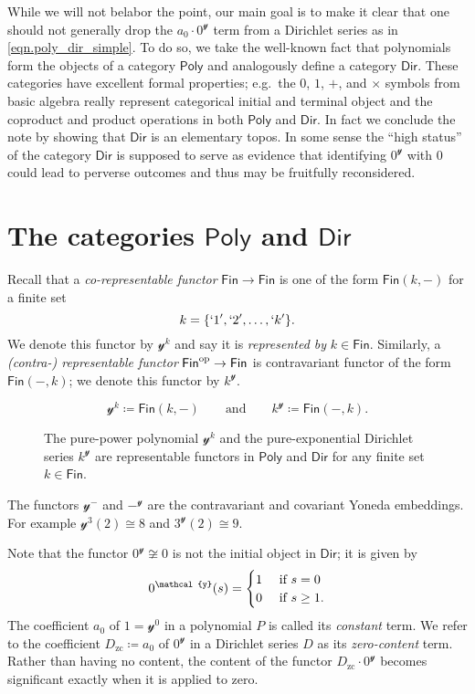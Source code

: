 \documentclass[11pt, article, one side]{memoir}
\theoremstyle{theorem}
\theoremstyle{definition}
\theoremstyle{remark}
\newcommand{\Cat}[1]{\mathsf{#1}}%
\newcommand{\op}{^\tn{op}}
\newcommand{\tn}[1]{\textnormal{#1}}
\newcommand{\finset}{\Cat{Fin}}
\newcommand{\zero}[1]{#1_\text{zc}}
\newcommand{\yon}{\mathcal{y}}
\newcommand{\poly}{\Cat{Poly}}
\newcommand{\dir}{\Cat{Dir}}
\newcommand{\mdot}{{\cdot}}
\newcommand{\qqand}{\qquad\text{and}\qquad}
\begin{document}
While we will not belabor the point, our main goal is to make it clear that one should not generally drop the $a_0\cdot0^\yon$ term from a Dirichlet series as in \cref{eqn.poly_dir_simple}. To do so, we take the well-known fact that polynomials form the objects of a category $\poly$ and analogously define a category $\dir$. These categories have excellent formal properties; e.g.\ the $0$, $1$, $+$, and $\times$ symbols from basic algebra really represent categorical initial and terminal object and the coproduct and product operations in both $\poly$ and $\dir$. In fact we conclude the note by showing that $\dir$ is an elementary topos. In some sense the ``high status'' of the category $\dir$ is supposed to serve as evidence that identifying $0^\yon$ with $0$ could lead to perverse outcomes and thus may be fruitfully reconsidered.

\chapter{The categories $\poly$ and $\dir$}
Recall that a \emph{co-representable functor} $\finset\to\finset$ is one of the form $\finset(k, -)$ for a finite set
\[k=\{`1', `2',\ldots,`k'\}.\]
We denote this functor by $\yon^k$ and say it is \emph{represented by} $k\in\finset$. Similarly, a \emph{(contra-) representable functor} $\finset\op\to\finset$ is contravariant functor of the form $\finset(-,k)$; we denote this functor by $k^\yon$.
\begin{figure}
\[
  \yon^k \coloneqq \finset(k,-)
  \qqand
  k^\yon\coloneqq\finset(-,k).
\]
  \caption{The pure-power polynomial $\yon^k$ and the pure-exponential Dirichlet series $k^\yon$ are representable functors in $\poly$ and $\dir$ for any finite set $k\in\finset$.}
\end{figure}
The functors $\yon^-$ and $-^\yon$ are the contravariant and covariant Yoneda embeddings. For example $\yon^3(2)\cong8$ and $3^\yon(2)\cong9$.

Note that the functor $0^\yon\not\cong 0$ is not the initial object in $\dir$; it is given by
\[
0^\yon(s)=
\begin{cases}
1&\tn{ if } s=0\\
0&\tn{ if } s\geq1.
\end{cases}
\]
The coefficient $a_0$ of $1=\yon^0$ in a polynomial $P$ is called its \emph{constant} term. We refer to the coefficient $\zero{D}\coloneqq a_0$ of $0^\yon$ in a Dirichlet series $D$ as its \emph{zero-content} term. Rather than having no content, the content of the functor $\zero{D}\mdot0^\yon$ becomes significant exactly when it is applied to zero.
\end{document}
